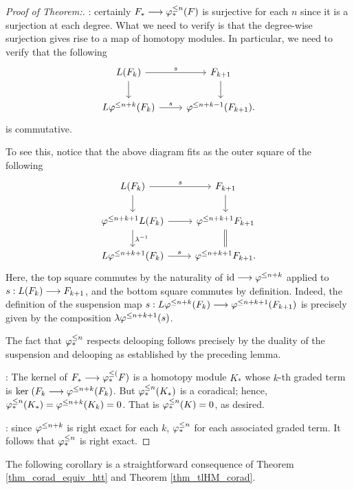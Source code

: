 \begin{proof}[Proof of Theorem:]

 : certainly $F_* \longrightarrow 
\varphi^{\leq n}_{*}(F)$ is surjective for each $n$ since it is a surjection 
at each degree. What we need to verify is that the degree-wise 
surjection gives rise to a map of homotopy modules. In particular, 
we need to verify that the following
\[
\begin{tikzcd}
L(F_k) \arrow{r}{\susp} \arrow{d} &
F_{k + 1} \arrow{d} \\
L \tlHI{n + k}(F_k) \arrow{r}{\susp} &
\tlHI{n + k - 1}(F_{k + 1}).
\end{tikzcd}
\]
is commutative.

To see this, notice that the above diagram fits as the outer 
square of the following
\[
\begin{tikzcd}
L(F_k) \arrow{r}{\susp} \arrow{d} &
F_{k + 1} \arrow{d} \\
\tlHI{n + k + 1} L(F_k) \arrow{r} \arrow{d}{\lambda^{-1}} &
\tlHI{n + k + 1} F_{k + 1} \arrow[equals]{d} \\
L \tlHI{n + k + 1}(F_k) \arrow{r}{\susp} &
\tlHI{n + k + 1} F_{k + 1}.
\end{tikzcd}
\]
Here, the top square commutes by the naturality of $\mathrm{id} \longrightarrow 
\varphi^{\leq n + k}$ applied to $s: L(F_k) \longrightarrow F_{k + 1}$, and the 
bottom square commutes by definition. Indeed, the definition of 
the suspension map $s: L \varphi^{\leq n + k}(F_k) \longrightarrow 
\varphi^{\leq n + k + 1}(F_{k + 1})$ is precisely given by the composition
$\lambda \varphi^{\leq n + k + 1}(s)$.

The fact that $\varphi^{\leq n}_{*}$ respects delooping follows precisely by
the duality of the suspension and delooping as established by the
preceding lemma.

 : The kernel of $F_* \longrightarrow 
\varphi^{\leq (}_{*}F)$ is a homotopy module $K_*$ whose $k$-th graded term is 
$\mathrm{ker}\; (F_k \longrightarrow \varphi^{\leq n + k}(F_k)$. But $\varphi^{\leq n}_{*}(K_*)$ is a 
coradical; hence, $\varphi^{\leq n}_{*}(K_*) = \varphi^{\leq n + k}(K_k) = 0$. That
is $\varphi^{\leq n}_{*}(K) = 0$, as desired.

 : since $\varphi^{\leq n + k}$ is 
right exact for each $k$, $\varphi^{\leq n}_{*}$ for each associated graded 
term. It follows that $\varphi^{\leq n}_{*}$ is right exact.
\end{proof}

The following corollary is a straightforward consequence of 
Theorem \ref{thm_corad_equiv_htt} and Theorem 
\ref{thm_tlHM_corad}.

